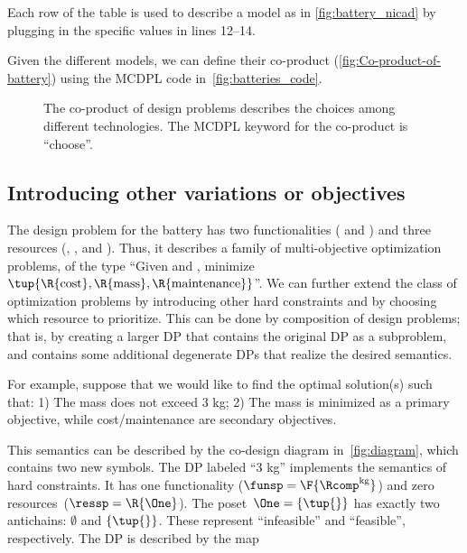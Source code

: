 Each row of the table is used to describe a model as in \cref{fig:battery_nicad} by plugging in the specific values in lines 12--14.

Given the different models, we can define their co-product (\cref{fig:Co-product-of-battery}) using the MCDPL code in~\cref{fig:batteries_code}.

\begin{figure}[h]

    \caption{
        The co-product of design problems describes the choices among different technologies.
        The MCDPL keyword for the co-product is ``choose''.
    }
    \label{fig:batteriesbig}
\end{figure}

\subsection{Introducing other variations or objectives}

The design problem for the battery has two functionalities ( and ) and three resources (, , and ).
Thus, it describes a family of multi-objective optimization problems, of the type ``Given  and , minimize $\tup{ \R{\text{cost}},\R{\text{mass}},\R{\text{maintenance}}} $''.
We can further extend the class of optimization problems by introducing other hard constraints and by choosing which resource to prioritize.
This can be done by composition of design problems; that is, by creating a larger DP that contains the original DP as a subproblem, and contains some additional degenerate DPs that realize the desired semantics.

For example, suppose that we would like to find the optimal solution(s) such that: 1) The mass does not exceed 3 kg; 2) The mass is minimized as a primary objective, while cost/maintenance are secondary objectives.

This semantics can be described by the co-design diagram in~\cref{fig:diagram}, which contains two new symbols.
The DP labeled ``3 kg'' implements the semantics of hard constraints.
It has one functionality ($\funsp=\F{\Rcomp^{\text{kg}}}$) and zero resources~($\ressp=\R{\One}$).
The poset~$\One=\{\tup{ } \}$ has exactly two antichains: $\emptyset$ and $\{\tup{ } \}$.
These represent ``infeasible'' and ``feasible'', respectively.
The DP is described by the map

